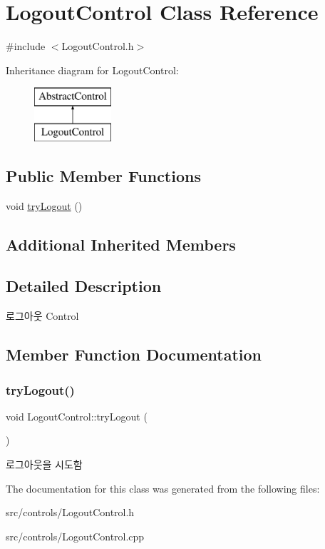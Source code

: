 \hypertarget{class_logout_control}{}\section{Logout\+Control Class Reference}
\label{class_logout_control}


{\ttfamily \#include $<$Logout\+Control.\+h$>$}

Inheritance diagram for Logout\+Control\+:\begin{figure}[H]
\begin{center}
\leavevmode
\includegraphics[height=2.000000cm]{class_logout_control}
\end{center}
\end{figure}
\subsection*{Public Member Functions}
\begin{DoxyCompactItemize}
\item 
void \mbox{\hyperlink{class_logout_control_a312833da79ce891bcfd9879f8a5a2d52}{try\+Logout}} ()
\end{DoxyCompactItemize}
\subsection*{Additional Inherited Members}


\subsection{Detailed Description}
로그아웃 Control 

\subsection{Member Function Documentation}
\mbox{\label{class_logout_control_a312833da79ce891bcfd9879f8a5a2d52}} 
\subsubsection{\texorpdfstring{try\+Logout()}{tryLogout()}}
{\footnotesize\ttfamily void Logout\+Control\+::try\+Logout (\begin{DoxyParamCaption}{ }\end{DoxyParamCaption})}

로그아웃을 시도함 

The documentation for this class was generated from the following files\+:\begin{DoxyCompactItemize}
\item 
src/controls/Logout\+Control.\+h\item 
src/controls/Logout\+Control.\+cpp\end{DoxyCompactItemize}
